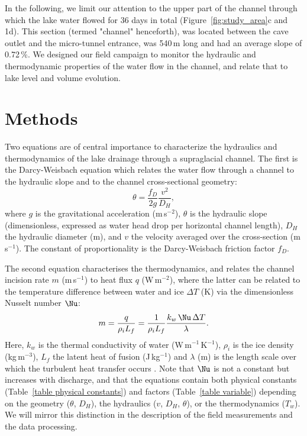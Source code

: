 In the following, we limit our attention to the upper part of the channel through which the lake water flowed for 36 days in total (Figure~\ref{fig:study_area}c and 1d). This section (termed "channel" henceforth), was located between the cave outlet and the micro-tunnel entrance, was 540\,m long and had an average slope of 0.72\,\%. We designed our field campaign to monitor the hydraulic and thermodynamic properties of the water flow in the channel, and relate that to lake level and volume evolution.

\section{Methods}
\label{sec:methods}

Two equations are of central importance to characterize the hydraulics and thermodynamics of the lake drainage through a supraglacial channel. The first is the Darcy-Weisbach equation \citep{Incropera&al2007} which relates the water flow through a channel to the hydraulic slope and to the channel cross-sectional geometry:
%
\begin{equation}
  \label{eq:friction_factor}
  \theta = \frac{f_D}{2g} \frac{v^2}{D_H},
\end{equation}
%
where $g$ is the gravitational acceleration (m\,s$^{-2}$), $\theta$ is the hydraulic slope (dimensionless, expressed as water head drop per horizontal channel length), $D_H$ the hydraulic diameter (m), and $v$ the velocity averaged over the cross-section (m\,s$^{-1}$). The constant of proportionality is the Darcy-Weisbach friction factor $f_D$.

The second equation characterises the thermodynamics, and relates the channel incision rate $m$ (m\,s$^{-1}$) to heat flux $q$ (W\,m$^{-2}$), where the latter can be related to the temperature difference between water and ice $\Delta T$ (K) via the dimensionless Nusselt number $\Nu$:
%
\begin{equation}
  \label{eq:melt-rate}
  m = \frac{q}{\rho_i L_f} =  \frac{1}{\rho_i L_f} \frac{k_w \,  \Nu \,  \Delta T}{\lambda}.
\end{equation}
%
Here, $k_w$ is the thermal conductivity of water (W\,m$^{-1}$\,K$^{-1}$), $\rho_i$ is the ice density (kg\,m$^{-3}$), $L_f$ the latent heat of fusion (J\,kg$^{-1}$) and $\lambda$ (m) is the length scale over which the turbulent heat transfer occurs \citep{Incropera&al2007}.
Note that $\Nu$ is not a constant but increases with discharge, and that the equations contain both physical constants (Table~\ref{table physical constants}) and factors (Table~\ref{table variable}) depending on the geometry ($\theta$, $D_H$), the hydraulics ($v$, $D_H$, $\theta$), or the thermodynamics ($T_w$). We will mirror this distinction in the description of the field measurements and the data processing.

